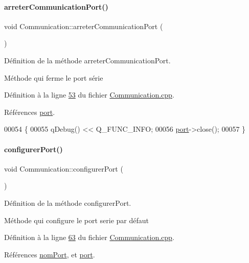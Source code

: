 \paragraph{\texorpdfstring{arreter\+Communication\+Port()}{arreterCommunicationPort()}}
{\footnotesize\ttfamily void Communication\+::arreter\+Communication\+Port (\begin{DoxyParamCaption}{ }\end{DoxyParamCaption})}



Définition de la méthode arreter\+Communication\+Port. 

Méthode qui ferme le port série 

Définition à la ligne \hyperlink{_communication_8cpp_source_l00053}{53} du fichier \hyperlink{_communication_8cpp_source}{Communication.\+cpp}.



Références \hyperlink{_communication_8h_source_l00067}{port}.


\begin{DoxyCode}
00054 \{
00055     qDebug() << Q\_FUNC\_INFO;
00056     \hyperlink{class_communication_aff7d55208f31232fbdc1dcec488908f1}{port}->close();
00057 \}
\end{DoxyCode}
\mbox{\label{class_communication_ae39284eac0920a3d11c085b48c6234da}} 
\paragraph{\texorpdfstring{configurer\+Port()}{configurerPort()}}
{\footnotesize\ttfamily void Communication\+::configurer\+Port (\begin{DoxyParamCaption}{ }\end{DoxyParamCaption})}



Définition de la méthode configurer\+Port. 

Méthode qui configure le port serie par défaut 

Définition à la ligne \hyperlink{_communication_8cpp_source_l00063}{63} du fichier \hyperlink{_communication_8cpp_source}{Communication.\+cpp}.



Références \hyperlink{_communication_8h_source_l00069}{nom\+Port}, et \hyperlink{_communication_8h_source_l00067}{port}.



